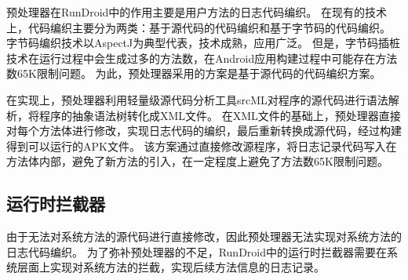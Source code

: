 预处理器在RunDroid中的作用主要是用户方法的日志代码编织。
在现有的技术上，代码编织主要分为两类：基于源代码的代码编织和基于字节码的代码编织。
字节码编织技术以AspectJ\cite{TheAspecJ}为典型代表，技术成熟，应用广泛。
但是，字节码插桩技术在运行过程中会生成过多的方法数，在Android应用构建过程中可能存在方法数65K限制问题。
为此，预处理器采用的方案是基于源代码的代码编织方案。

在实现上，预处理器利用轻量级源代码分析工具srcML\cite{collard2013srcml}对程序的源代码进行语法解析，将程序的抽象语法树转化成XML文件。
在XML文件的基础上，预处理器直接对每个方法体进行修改，实现日志代码的编织，最后重新转换成源代码，经过构建得到可以运行的APK文件。
该方案通过直接修改源程序，将日志记录代码写入在方法体内部，避免了新方法的引入，在一定程度上避免了方法数65K限制问题。


\subsection{运行时拦截器}%

由于无法对系统方法的源代码进行直接修改，因此预处理器无法实现对系统方法的日志代码编织。
为了弥补预处理器的不足，RunDroid中的运行时拦截器需要在系统层面上实现对系统方法的拦截，实现后续方法信息的日志记录。





